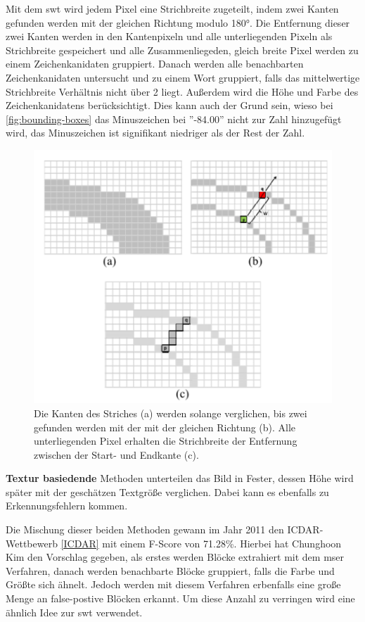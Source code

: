 Mit dem \Gls{swt} wird jedem Pixel eine Strichbreite zugeteilt, indem zwei Kanten gefunden werden mit der gleichen Richtung modulo 180°. Die Entfernung dieser zwei Kanten werden in den Kantenpixeln und alle unterliegenden Pixeln als Strichbreite gespeichert und alle Zusammenliegeden, gleich breite Pixel werden zu einem Zeichenkanidaten gruppiert. Danach werden alle benachbarten Zeichenkanidaten untersucht und zu einem Wort gruppiert, falls das mittelwertige Strichbreite Verhältnis nicht über 2 liegt. Außerdem wird die Höhe und Farbe des Zeichenkanidatens berücksichtigt. Dies kann auch der Grund sein, wieso bei \ref{fig:bounding-boxes} das Minuszeichen bei ''-84.00'' nicht zur Zahl hinzugefügt wird, das Minuszeichen ist signifikant niedriger als der Rest der Zahl. \cite{SWT:online}

\begin{figure}[H]
    \centering
    \includegraphics[scale=0.7]{sections/machine-learning/images/SWT.png}
    \caption{Die Kanten des Striches (a) werden solange verglichen, bis zwei gefunden werden mit der mit der gleichen Richtung (b). Alle unterliegenden Pixel erhalten die Strichbreite der Entfernung zwischen der Start- und Endkante (c).}
\end{figure}

\textbf{Textur basiedende} Methoden unterteilen das Bild in Fester, dessen Höhe wird später mit der geschätzen Textgröße verglichen. Dabei kann es ebenfalls zu Erkennungsfehlern kommen.

Die Mischung dieser beiden Methoden gewann im Jahr 2011 den ICDAR-Wettbewerb \ref*{ICDAR} mit einem F-Score von 71.28\%. Hierbei hat Chunghoon Kim den Vorschlag gegeben, als erstes werden Blöcke extrahiert mit dem \Gls{mser} Verfahren, danach werden benachbarte Blöcke gruppiert, falls die Farbe und Größte sich ähnelt. Jedoch werden mit diesem Verfahren erbenfalls eine große Menge an false-postive Blöcken erkannt. Um diese Anzahl zu verringen wird eine ähnlich Idee zur \gls{swt} verwendet.

